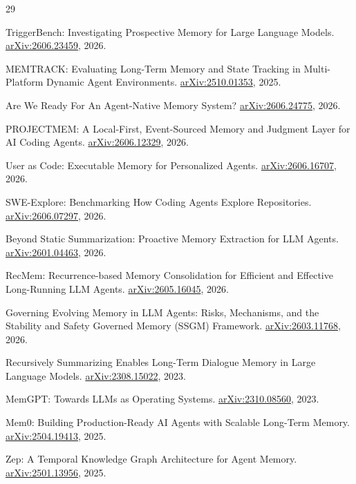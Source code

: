 \documentclass[11pt]{article}
\begin{document}
\begin{thebibliography}{29}

 TriggerBench: Investigating Prospective Memory for Large Language Models. \href{https://arxiv.org/abs/2606.23459}{arXiv:2606.23459}, 2026.

 MEMTRACK: Evaluating Long-Term Memory and State Tracking in Multi-Platform Dynamic Agent Environments. \href{https://arxiv.org/abs/2510.01353}{arXiv:2510.01353}, 2025.

 Are We Ready For An Agent-Native Memory System? \href{https://arxiv.org/abs/2606.24775}{arXiv:2606.24775}, 2026.

 PROJECTMEM: A Local-First, Event-Sourced Memory and Judgment Layer for AI Coding Agents. \href{https://arxiv.org/abs/2606.12329}{arXiv:2606.12329}, 2026.

 User as Code: Executable Memory for Personalized Agents. \href{https://arxiv.org/abs/2606.16707}{arXiv:2606.16707}, 2026.

 SWE-Explore: Benchmarking How Coding Agents Explore Repositories. \href{https://arxiv.org/abs/2606.07297}{arXiv:2606.07297}, 2026.

 Beyond Static Summarization: Proactive Memory Extraction for LLM Agents. \href{https://arxiv.org/abs/2601.04463}{arXiv:2601.04463}, 2026.

 RecMem: Recurrence-based Memory Consolidation for Efficient and Effective Long-Running LLM Agents. \href{https://arxiv.org/abs/2605.16045}{arXiv:2605.16045}, 2026.

 Governing Evolving Memory in LLM Agents: Risks, Mechanisms, and the Stability and Safety Governed Memory (SSGM) Framework. \href{https://arxiv.org/abs/2603.11768}{arXiv:2603.11768}, 2026.

 Recursively Summarizing Enables Long-Term Dialogue Memory in Large Language Models. \href{https://arxiv.org/abs/2308.15022}{arXiv:2308.15022}, 2023.

 MemGPT: Towards LLMs as Operating Systems. \href{https://arxiv.org/abs/2310.08560}{arXiv:2310.08560}, 2023.

 Mem0: Building Production-Ready AI Agents with Scalable Long-Term Memory. \href{https://arxiv.org/abs/2504.19413}{arXiv:2504.19413}, 2025.

 Zep: A Temporal Knowledge Graph Architecture for Agent Memory. \href{https://arxiv.org/abs/2501.13956}{arXiv:2501.13956}, 2025.


\end{thebibliography}
\end{document}
